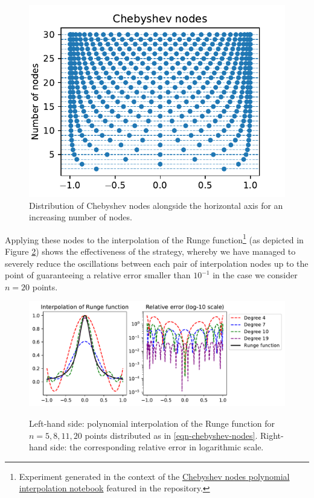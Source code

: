 \documentclass[12pt]{report} %
\begin{document}
\begin{figure}[ht]
  \centering
  \includegraphics[width=.5\textwidth]{imagenes/polynomial_interpolation/Chebyshev_Nodes.pdf}
  \caption{Distribution of Chebyshev nodes alongside the horizontal axis for an increasing number of nodes.}
  \label{fig:chebyshev-nodes}
\end{figure}



Applying these nodes to the
interpolation of the Runge function\footnote{Experiment generated in the context of the \href{https://github.com/heqro/tfm-experiments/blob/main/introductory_notebooks/polynomial_interpolation/runge_chebyshev.ipynb}{Chebyshev nodes polynomial interpolation notebook} featured in the repository.} (as depicted in Figure
\ref{fig:runge-polynomial-cheb}) shows the effectiveness of the strategy,
whereby we have managed to severely reduce the oscillations between each pair
of interpolation nodes up to the point of guaranteeing a relative error
smaller than $10^{- 1}$ in the case we consider $n = 20$ points.

\begin{figure}[ht]
  \centering
  {\includegraphics[width=\textwidth]{imagenes/polynomial_interpolation/Runge_Polynomial_Cheb.pdf}}
  \caption{Left-hand side: polynomial interpolation of the Runge function for $n=5, 8, 11, 20$ points distributed as in \eqref{eqn-chebyshev-nodes}. Right-hand side: the corresponding relative error in logarithmic scale.}
  \label{fig:runge-polynomial-cheb}
\end{figure}
\end{document}

